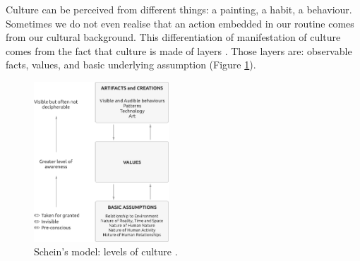 \documentclass[../main.tex]{subfiles}
\begin{document}
Culture can be perceived from different things: a painting, a habit, a behaviour. Sometimes we do not even realise that an action embedded in our routine comes from our cultural background. 
This differentiation of manifestation of culture comes from the fact that culture is made of layers \autocite[3]{schein}.
Those layers are: observable facts, values, and basic underlying assumption (Figure \ref{fig:schein}).
\begin{figure}[h]
    \centering\includegraphics[width=0.45\textwidth]{images/values}
    \caption{Schein's model: levels of culture \autocite[4]{schein}.} %
    \label{fig:schein}
\end{figure}
\end{document}

